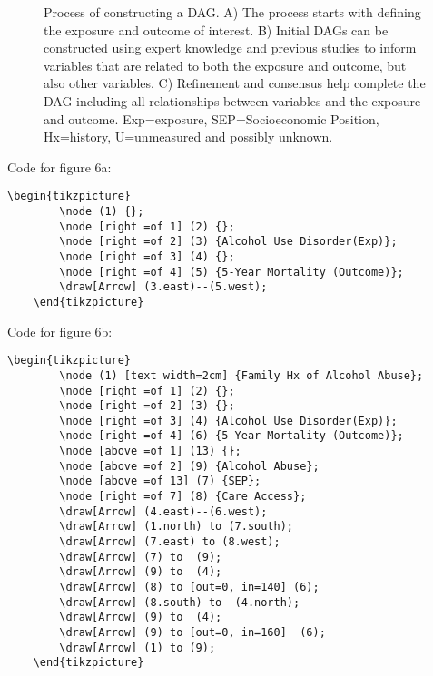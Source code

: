 \documentclass{article}
\begin{document}
\begin{figure}[H]
\caption{Process of constructing a DAG. A) The process starts with defining the exposure and outcome of interest. B) Initial DAGs can be constructed using expert knowledge and previous studies to inform variables that are related to both the exposure and outcome, but also other variables. C) Refinement and consensus help complete the DAG including all relationships between variables and the exposure and outcome. Exp=exposure, SEP=Socioeconomic Position, Hx=history, U=unmeasured and possibly unknown.}
\end{figure}


Code for figure 6a:
\begin{lstlisting}[frame=single, basicstyle=\ttfamily]
    \begin{tikzpicture}
        \node (1) {};
        \node [right =of 1] (2) {};
        \node [right =of 2] (3) {Alcohol Use Disorder(Exp)};
        \node [right =of 3] (4) {};
        \node [right =of 4] (5) {5-Year Mortality (Outcome)};
        \draw[Arrow] (3.east)--(5.west);
    \end{tikzpicture}
\end{lstlisting}

Code for figure 6b:
\begin{lstlisting}[frame=single, basicstyle=\ttfamily]
    \begin{tikzpicture}
        \node (1) [text width=2cm] {Family Hx of Alcohol Abuse};
        \node [right =of 1] (2) {};
        \node [right =of 2] (3) {};
        \node [right =of 3] (4) {Alcohol Use Disorder(Exp)};
        \node [right =of 4] (6) {5-Year Mortality (Outcome)};
        \node [above =of 1] (13) {};
        \node [above =of 2] (9) {Alcohol Abuse};
        \node [above =of 13] (7) {SEP};
        \node [right =of 7] (8) {Care Access};
        \draw[Arrow] (4.east)--(6.west);
        \draw[Arrow] (1.north) to (7.south);
        \draw[Arrow] (7.east) to (8.west);
        \draw[Arrow] (7) to  (9);
        \draw[Arrow] (9) to  (4);
        \draw[Arrow] (8) to [out=0, in=140] (6);
        \draw[Arrow] (8.south) to  (4.north);
        \draw[Arrow] (9) to  (4);
        \draw[Arrow] (9) to [out=0, in=160]  (6);
        \draw[Arrow] (1) to (9);
    \end{tikzpicture}
    

\end{lstlisting}
\end{document}

